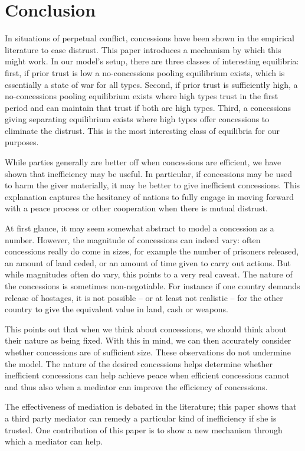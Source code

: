 \documentclass[12pt, letterpaper]{article}
\begin{document}
\section{Conclusion}
In situations of perpetual conflict, concessions have been shown in the empirical literature to ease distrust. This paper introduces a mechanism by which this might work. In our model's setup, there are three classes of interesting equilibria: first, if prior trust is low a no-concessions pooling equilibrium exists, which is essentially a state of war for all types. Second, if prior trust is sufficiently high, a no-concessions pooling equilibrium exists where high types trust in the first period and can maintain that trust if both are high types. Third, a concessions giving separating equilibrium exists where high types offer concessions to eliminate the distrust. This is the most interesting class of equilibria for our purposes.

While parties generally are better off when concessions are efficient, we have shown that inefficiency may be useful. In particular, if concessions may be used to harm the giver materially, it may be better to give inefficient concessions. This explanation captures the hesitancy of nations to fully engage in moving forward with a peace process or other cooperation when there is mutual distrust. 

At first glance, it may seem somewhat abstract to model a concession as a number. However, the magnitude of concessions can indeed vary: often concessions really do come in sizes, for example the number of prisoners released, an amount of land ceded, or an amount of time given to carry out actions. But while magnitudes often do vary, this points to a very real caveat. The nature of the concessions is sometimes non-negotiable. For instance if one country demands release of hostages, it is not possible -- or at least not realistic -- for the other country to give the equivalent value in land, cash or weapons.

This points out that when we think about concessions, we should think about their nature as being fixed. With this in mind, we can then accurately consider whether concessions are of sufficient size. These observations do not undermine the model. The nature of the desired concessions helps determine whether inefficient concessions can help achieve peace when efficient concessions cannot and thus also when a mediator can improve the efficiency of concessions.

The effectiveness of mediation is debated in the literature; this paper shows that a third party mediator can remedy a particular kind of inefficiency if she is trusted. One contribution of this paper is to show a new mechanism through which a mediator can help.
\end{document}
